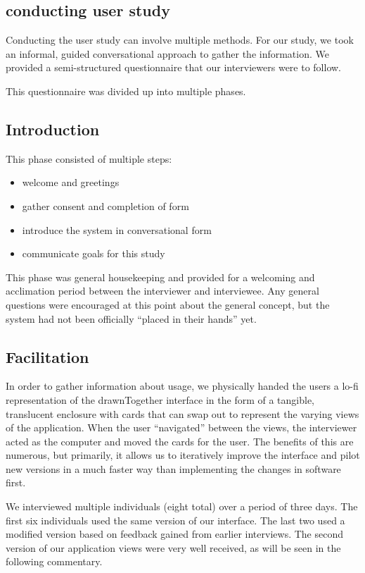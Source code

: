 \documentclass{chi2009}
\begin{document}
\subsection{conducting user study}

Conducting the user study can involve multiple methods.  For our study, we took
an informal, guided conversational approach to gather the information.  We
provided a semi-structured questionnaire that our interviewers were to follow.

This questionnaire was divided up into multiple phases.

\subsection{Introduction}

This phase consisted of multiple steps:
\begin{itemize}
\item welcome and greetings
\item gather consent and completion of form
\item introduce the system in conversational form
\item communicate goals for this study
\end{itemize}

This phase was general housekeeping and provided for a welcoming and
acclimation period between the interviewer and interviewee.  Any general
questions were encouraged at this point about the general concept, but the
system had not been officially ``placed in their hands'' yet.

\subsection{Facilitation}
In order to gather information about usage, we physically handed the users a
lo-fi representation of the drawnTogether interface in the form of a tangible,
translucent enclosure with cards that can swap out to represent the varying
views of the application.  When the user ``navigated'' between the views, the
interviewer acted as the computer and moved the cards for the user.  The
benefits of this are numerous, but primarily, it allows us to iteratively
improve the interface and pilot new versions in a much faster way than
implementing the changes in software first.

We interviewed multiple individuals (eight total) over a period of three days.
The first six individuals used the same version of our interface.  The last two
used a modified version based on feedback gained from earlier interviews.  The
second version of our application views were very well received, as will be
seen in the following commentary.
\end{document}
